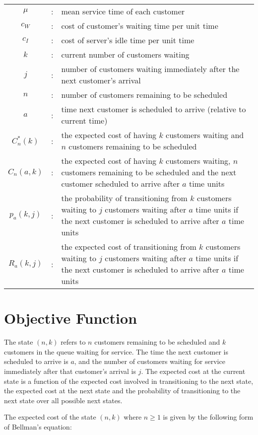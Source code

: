 \begin{tabularx}{\textwidth}{c c X}
	$\mu$ & : & mean service time of each customer \\
	$c_{W}$ & : & cost of customer's waiting time per unit time \\
	$c_{I}$ & : & cost of server's idle time per unit time \\
	$k$ & : & current number of customers waiting \\
	$j$ & : & number of customers waiting immediately after the next customer's arrival \\
	$n$ & : & number of customers remaining to be scheduled \\
	$a$ & : & time next customer is scheduled to arrive (relative to current time) \\
	$C_{n}^{*} (k)$ & : & the expected cost of having $k$ customers waiting and $n$ customers remaining to be scheduled \\
	$C_{n} (a, k)$ & : & the expected cost of having $k$ customers waiting, $n$ customers remaining to be scheduled and the next customer scheduled to arrive after $a$ time units \\
	$p_{a} (k, j)$ & : & the probability of transitioning from $k$ customers waiting to $j$ customers waiting after $a$ time units if the next customer is scheduled to arrive after $a$ time units \\
	$R_{a} (k, j)$ & : & the expected cost of transitioning from $k$ customers waiting to $j$ customers waiting after $a$ time units if the next customer is scheduled to arrive after $a$ time units
\end{tabularx}

\section{Objective Function}

The state $(n, k)$ refers to $n$ customers remaining to be scheduled and $k$ customers in the queue waiting for service. The time the next customer is scheduled to arrive is $a$, and the number of customers waiting for service immediately after that customer's arrival is $j$. The expected cost at the current state is a function of the expected cost involved in transitioning to the next state, the expected cost at the next state and the probability of transitioning to the next state over all possible next states. 

The expected cost of the state $(n, k)$ where $n \geq 1$ is given by the following form of Bellman's equation:

